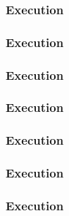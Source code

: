 \documentclass{beamer}
\begin{document}
\begin{frame}[fragile]
\frametitle{Execution}
\begin{block}{}
\end{block}
\end{frame}

\begin{frame}[fragile]
\frametitle{Execution}
\begin{block}{}
\end{block}
\end{frame}

\begin{frame}[fragile]
\frametitle{Execution}
\begin{block}{}
\end{block}
\end{frame}

\begin{frame}[fragile]
\frametitle{Execution}
\begin{block}{}
\end{block}
\end{frame}

\begin{frame}[fragile]
\frametitle{Execution}
\begin{block}{}
\end{block}
\end{frame}

\begin{frame}[fragile]
\frametitle{Execution}
\begin{block}{}
\end{block}
\end{frame}


\begin{frame}[fragile]
\frametitle{Execution}
\begin{block}{}
\end{block}
\end{frame}
\end{document}
